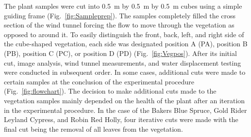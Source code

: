 \documentclass[12pt]{article}
\begin{document}
The plant samples were cut into 0.5~\si{m} by 0.5~\si{m} by 0.5~\si{m} cubes using a simple guiding frame  (Fig.~\ref{fig:Sampleprep}). The samples completely filled the cross section of the wind tunnel forcing the flow to move through the vegetation as opposed to around it. To easily distinguish the front, back, left, and right side of the cube-shaped vegetation, each side was designated position A (PA), position B (PB), position C (PC), or position D (PD) (Fig.~\ref{fig:Vegpos}). After its initial cut, image analysis, wind tunnel measurements, and water displacement testing were conducted in subsequent order. In some cases, additional cuts were made to certain samples at the conclusion of the experimental procedure (Fig.~\ref{fig:flowchart}). The decision to make additional cuts made to the vegetation samples mainly depended on the health of the plant after an iteration in the experimental procedure. In the case of the Bakers Blue Spruce, Gold Rider Leyland Cypress, and Robin Red Holly, four iterative cuts were made with the final cut being the removal of all leaves from the vegetation.
\end{document}
